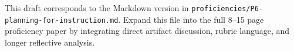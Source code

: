 \documentclass[12pt]{article}
\begin{document}
\begin{titlepage}\begin{center}\vspace*{0.2\textheight}{\Large\bfseries Proficiency 6: Planning for Instruction\par}\vspace{2em}{\PortfolioAuthor\par}{\PortfolioAffiliation\par}{\PortfolioProgram\par}\vspace{2em}{\PortfolioDate\par}\end{center}\end{titlepage}
This draft corresponds to the Markdown version in \texttt{proficiencies/P6-planning-for-instruction.md}. Expand this file into the full 8--15 page proficiency paper by integrating direct artifact discussion, rubric language, and longer reflective analysis.
\end{document}
